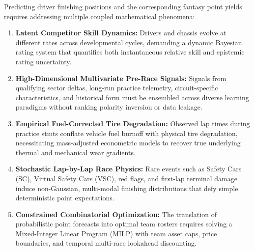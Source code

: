Predicting driver finishing positions and the corresponding fantasy point yields requires addressing multiple coupled mathematical phenomena:
\begin{enumerate}
    \item \textbf{Latent Competitor Skill Dynamics:} Drivers and chassis evolve at different rates across developmental cycles, demanding a dynamic Bayesian rating system that quantifies both instantaneous relative skill and epistemic rating uncertainty.
    \item \textbf{High-Dimensional Multivariate Pre-Race Signals:} Signals from qualifying sector deltas, long-run practice telemetry, circuit-specific characteristics, and historical form must be ensembled across diverse learning paradigms without ranking polarity inversion or data leakage.
    \item \textbf{Empirical Fuel-Corrected Tire Degradation:} Observed lap times during practice stints conflate vehicle fuel burnoff with physical tire degradation, necessitating mass-adjusted econometric models to recover true underlying thermal and mechanical wear gradients.
    \item \textbf{Stochastic Lap-by-Lap Race Physics:} Rare events such as Safety Cars (SC), Virtual Safety Cars (VSC), red flags, and first-lap terminal damage induce non-Gaussian, multi-modal finishing distributions that defy simple deterministic point expectations.
    \item \textbf{Constrained Combinatorial Optimization:} The translation of probabilistic point forecasts into optimal team rosters requires solving a Mixed-Integer Linear Program (MILP) with team asset caps, price boundaries, and temporal multi-race lookahead discounting.
\end{enumerate}

